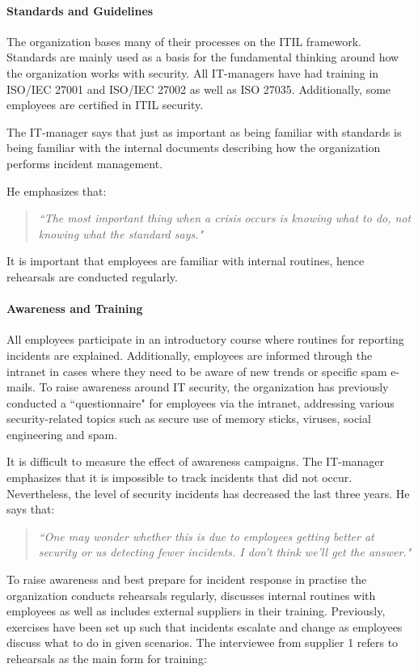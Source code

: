 \paragraph{Standards and Guidelines}
The organization bases many of their processes on the ITIL framework. Standards are mainly used as a basis for the fundamental thinking around how the organization works with security. All IT-managers have had training in ISO/IEC 27001 and ISO/IEC 27002 as well as ISO 27035. Additionally, some employees are certified in ITIL security.   

The IT-manager says that just as important as being familiar with standards is being familiar with the internal documents describing how the organization performs incident management. 

He emphasizes that:
\begin{quote}
\textit{``The most important thing when a crisis occurs is knowing what to do, not knowing what the standard says."}
\end{quote}
It is important that employees are familiar with internal routines, hence rehearsals are conducted regularly.

\paragraph{Awareness and Training}
All employees participate in an introductory course where routines for reporting incidents are explained. Additionally, employees are informed through the intranet in cases where they need to be aware of new trends or specific spam e-mails. To raise awareness around IT security, the organization has previously conducted a ``questionnaire" for employees via the intranet, addressing various security-related topics such as secure use of memory sticks, viruses, social engineering and spam. 

It is difficult to measure the effect of awareness campaigns. The IT-manager emphasizes that it is impossible to track incidents that did not occur. Nevertheless, the level of security incidents has decreased the last three years. He says that:
\begin{quote}
\textit{``One may wonder whether this is due to employees getting better at security or us detecting fewer incidents. I don't think we'll get the answer."}
\end{quote}
 
To raise awareness and best prepare for incident response in practise the organization conducts rehearsals regularly, discusses internal routines with employees as well as includes external suppliers in their training. Previously, exercises have been set up such that incidents escalate and change as employees discuss what to do in given scenarios. The interviewee from supplier 1 refers to rehearsals as the main form for training:

